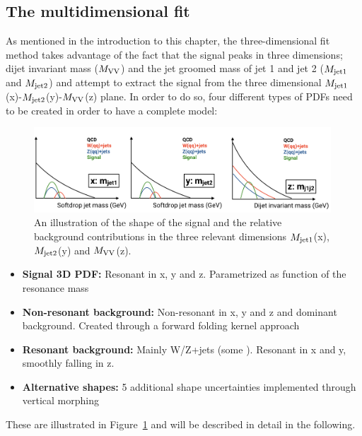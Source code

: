 \subsection{The multidimensional fit}
As mentioned in the introduction to this chapter, the three-dimensional fit method takes advantage of the fact that the signal peaks in three dimensions; dijet invariant mass ($M_{\rm VV}$) and the jet groomed mass of jet 1 and jet 2 ($M_{\rm jet1}$ and $M_{\rm jet2}$) and attempt to extract the signal from the three dimensional $M_{\rm jet1}$(x)-$M_{\rm jet2}$(y)-$M_{\rm VV}$(z) plane.
In order to do so, four different types of PDFs need to be created in order to have a complete model:
\begin{figure}[h!]
\centering
\includegraphics[width=0.99\textwidth]{figures/analysis/search3/misc/3Dfit.png}
\caption{An illustration of the shape of the signal and the relative background contributions in the three relevant dimensions $M_{\rm jet1}$(x), $M_{\rm jet2}$(y) and $M_{\rm VV}$(z). }
\label{fig:searchIII:3Dfit}
\end{figure}
\begin{itemize}
  \item \textbf{Signal 3D PDF:} Resonant in x, y and z. Parametrized as function of the resonance mass \mX
  \item \textbf{Non-resonant background:} Non-resonant in x, y and z and dominant background. Created through a forward folding kernel approach
  \item \textbf{Resonant background:} Mainly W/Z+jets (some \ttbar). Resonant in x and y, smoothly falling in z.
  \item \textbf{Alternative shapes:} 5 additional shape uncertainties implemented through vertical morphing  
\end{itemize}
These are illustrated in Figure~\ref{fig:searchIII:3Dfit} and will be described in detail in the following.

